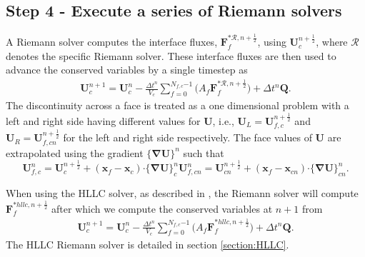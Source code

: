 \documentclass[10pt,letterpaper,notitlepage]{article}
\numberwithin{equation}{section}
\newcommand{\bnabla}{\boldsymbol{\nabla}}
\newcommand{\position}{\mathbf{x}}
\newcommand{\dotp}{\boldsymbol{\cdot}}
\newcommand{\beqn}{\begin{equation}\begin{aligned}}
\newcommand{\eeqn}{\end{aligned}\end{equation}}
\begin{document}
\subsection{Step 4 - Execute a series of Riemann solvers}
A Riemann solver computes the interface fluxes, $\mathbf{F}_f^{*\mathcal{R},n{+}\frac{1}{2}}$, using $\mathbf{U}_c^{n{+}\frac{1}{2}}$, where $\mathcal{R}$ denotes the specific Riemann solver. These interface fluxes are then used to advance the conserved variables by a single timestep as
\beqn 
\mathbf{U}_c^{n+1} = \mathbf{U}_c^n - \frac{\Delta t^n}{V_c} \sum_{f=0}^{N_{f,c}{-1}} 
\biggr(
A_f
\mathbf{F}_f^{*\mathcal{R},n{+}\frac{1}{2}}
\biggr)
+ \Delta t^n \mathbf{Q}.
\eeqn 
The discontinuity across a face is treated as a one dimensional problem with a left and right side having different values for $\mathbf{U}$, i.e., $\mathbf{U}_L = \mathbf{U}_{f,c}^{n{+}\frac{1}{2}}$ and $\mathbf{U}_R = \mathbf{U}_{f,cn}^{n{+}\frac{1}{2}}$ for the left and right side respectively. The face values of $\mathbf{U}$ are extrapolated using the gradient $\{\bnabla\mathbf{U}\}^n$ such that
\begin{subequations}
\begin{equation}
\mathbf{U}_{f,c}^{n} = \mathbf{U}_c^{n+\frac{1}{2}}  + (\position_{f} - \position_c) \dotp \big\{ \bnabla \mathbf{U} \big\}_c^n
\end{equation}
\begin{equation}
\mathbf{U}_{f,cn}^{n} = \mathbf{U}_{cn}^{n+\frac{1}{2}}  + (\position_{f} - \position_{cn}) \dotp \big\{ \bnabla \mathbf{U} \big\}_{cn}^n.
\end{equation}
\end{subequations}




When using the HLLC solver, as described in \cite{Toro}, the Riemann solver will compute $\mathbf{F}_f^{*hllc,n{+}\frac{1}{2}}$ after which we compute the conserved variables at $n+1$ from
\beqn 
\mathbf{U}_c^{n+1} = \mathbf{U}_c^n - \frac{\Delta t^n}{V_c} \sum_{f=0}^{N_{f,c}{-1}} 
\biggr(
A_f
\mathbf{F}_f^{*hllc,n{+}\frac{1}{2}}
\biggr)
+ \Delta t^n \mathbf{Q}.
\eeqn 
The HLLC Riemann solver is detailed in section \ref{section:HLLC}.

\newpage 
\end{document}

